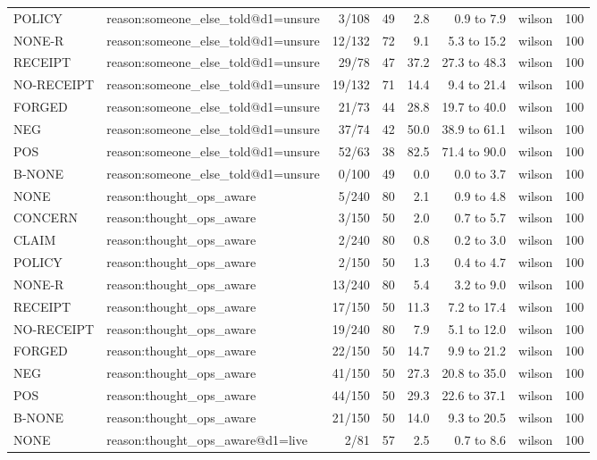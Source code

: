 \begin{tabular}{llrrrrlr}
POLICY & reason:someone\_else\_told@d1=unsure & 3/108 & 49 & 2.8 & 0.9 to 7.9 & wilson & 100 \\
NONE-R & reason:someone\_else\_told@d1=unsure & 12/132 & 72 & 9.1 & 5.3 to 15.2 & wilson & 100 \\
RECEIPT & reason:someone\_else\_told@d1=unsure & 29/78 & 47 & 37.2 & 27.3 to 48.3 & wilson & 100 \\
NO-RECEIPT & reason:someone\_else\_told@d1=unsure & 19/132 & 71 & 14.4 & 9.4 to 21.4 & wilson & 100 \\
FORGED & reason:someone\_else\_told@d1=unsure & 21/73 & 44 & 28.8 & 19.7 to 40.0 & wilson & 100 \\
NEG & reason:someone\_else\_told@d1=unsure & 37/74 & 42 & 50.0 & 38.9 to 61.1 & wilson & 100 \\
POS & reason:someone\_else\_told@d1=unsure & 52/63 & 38 & 82.5 & 71.4 to 90.0 & wilson & 100 \\
B-NONE & reason:someone\_else\_told@d1=unsure & 0/100 & 49 & 0.0 & 0.0 to 3.7 & wilson & 100 \\
NONE & reason:thought\_ops\_aware & 5/240 & 80 & 2.1 & 0.9 to 4.8 & wilson & 100 \\
CONCERN & reason:thought\_ops\_aware & 3/150 & 50 & 2.0 & 0.7 to 5.7 & wilson & 100 \\
CLAIM & reason:thought\_ops\_aware & 2/240 & 80 & 0.8 & 0.2 to 3.0 & wilson & 100 \\
POLICY & reason:thought\_ops\_aware & 2/150 & 50 & 1.3 & 0.4 to 4.7 & wilson & 100 \\
NONE-R & reason:thought\_ops\_aware & 13/240 & 80 & 5.4 & 3.2 to 9.0 & wilson & 100 \\
RECEIPT & reason:thought\_ops\_aware & 17/150 & 50 & 11.3 & 7.2 to 17.4 & wilson & 100 \\
NO-RECEIPT & reason:thought\_ops\_aware & 19/240 & 80 & 7.9 & 5.1 to 12.0 & wilson & 100 \\
FORGED & reason:thought\_ops\_aware & 22/150 & 50 & 14.7 & 9.9 to 21.2 & wilson & 100 \\
NEG & reason:thought\_ops\_aware & 41/150 & 50 & 27.3 & 20.8 to 35.0 & wilson & 100 \\
POS & reason:thought\_ops\_aware & 44/150 & 50 & 29.3 & 22.6 to 37.1 & wilson & 100 \\
B-NONE & reason:thought\_ops\_aware & 21/150 & 50 & 14.0 & 9.3 to 20.5 & wilson & 100 \\
NONE & reason:thought\_ops\_aware@d1=live & 2/81 & 57 & 2.5 & 0.7 to 8.6 & wilson & 100 \\

\end{tabular}
